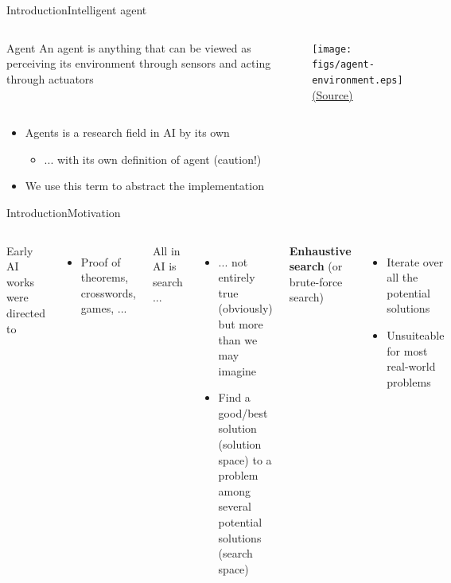 \documentclass[10pt,compress]{beamer} %
\begin{document}
\begin{frame}{Introduction}{Intelligent agent}
    \begin{columns}
        \begin{block}{Agent}
        An agent is anything that can be viewed as perceiving its environment through sensors and acting through actuators
        \end{block}

       \begin{center}
	        \texttt{[image: figs/agent-environment.eps]}\\
	        \tiny{\href{http://aima.cs.berkeley.edu/index.html}{(Source)}}
	    \end{center}

	\end{columns}

    \begin{itemize}
        \item Agents is a research field in AI by its own 
            \begin{itemize}
                \item ... with its own definition of agent (caution!)
            \end{itemize}
        \item We use this term to abstract the implementation
    \end{itemize}
\end{frame}

\begin{frame}{Introduction}{Motivation}

    \begin{columns}

    Early AI works were directed to
    \begin{itemize}
        \item Proof of theorems, crosswords, games, ...
    \end{itemize}

    All in AI is search ...
    \begin{itemize}
        \item ... not entirely true (obviously) but more than we may imagine
        \item Find a good/best solution (\alert{solution space}) to a problem among several potential solutions (\alert{search space})
    \end{itemize}

    \textbf{Enhaustive search} (or brute-force search)
    \begin{itemize}
        \item Iterate over all the potential solutions
        \item Unsuiteable for most real-world problems
    \end{itemize}

     
    \end{columns}
\end{frame}
\end{document}
